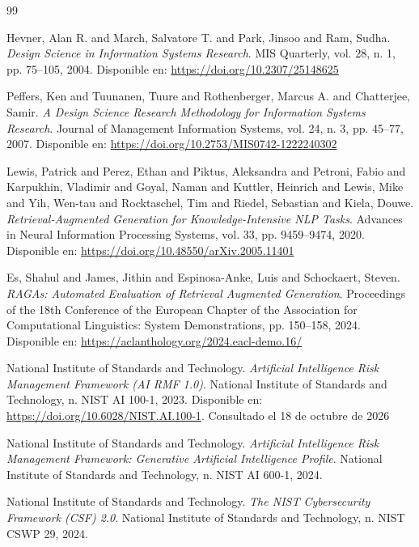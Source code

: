 \documentclass[12pt,twoside,titlepage]{book}
\begin{document}
\cleardoublepage
{}
\begin{thebibliography}{99}

 Hevner, Alan R. and March, Salvatore T. and Park, Jinsoo and Ram, Sudha. \textit{Design Science in Information Systems Research}. MIS Quarterly, vol. 28, n. 1, pp. 75--105, 2004. Disponible en: \url{https://doi.org/10.2307/25148625}

 Peffers, Ken and Tuunanen, Tuure and Rothenberger, Marcus A. and Chatterjee, Samir. \textit{A Design Science Research Methodology for Information Systems Research}. Journal of Management Information Systems, vol. 24, n. 3, pp. 45--77, 2007. Disponible en: \url{https://doi.org/10.2753/MIS0742-1222240302}

 Lewis, Patrick and Perez, Ethan and Piktus, Aleksandra and Petroni, Fabio and Karpukhin, Vladimir and Goyal, Naman and Kuttler, Heinrich and Lewis, Mike and Yih, Wen-tau and Rocktaschel, Tim and Riedel, Sebastian and Kiela, Douwe. \textit{Retrieval-Augmented Generation for Knowledge-Intensive {NLP} Tasks}. Advances in Neural Information Processing Systems, vol. 33, pp. 9459--9474, 2020. Disponible en: \url{https://doi.org/10.48550/arXiv.2005.11401}

 Es, Shahul and James, Jithin and Espinosa-Anke, Luis and Schockaert, Steven. \textit{{RAGAs}: Automated Evaluation of Retrieval Augmented Generation}. Proceedings of the 18th Conference of the European Chapter of the Association for Computational Linguistics: System Demonstrations, pp. 150--158, 2024. Disponible en: \url{https://aclanthology.org/2024.eacl-demo.16/}

 {National Institute of Standards and Technology}. \textit{Artificial Intelligence Risk Management Framework ({AI RMF} 1.0)}. National Institute of Standards and Technology, n. NIST AI 100-1, 2023. Disponible en: \url{https://doi.org/10.6028/NIST.AI.100-1}. Consultado el 18 de octubre de 2026

 {National Institute of Standards and Technology}. \textit{Artificial Intelligence Risk Management Framework: Generative Artificial Intelligence Profile}. National Institute of Standards and Technology, n. NIST AI 600-1, 2024.

 {National Institute of Standards and Technology}. \textit{The {NIST} Cybersecurity Framework ({CSF}) 2.0}. National Institute of Standards and Technology, n. NIST CSWP 29, 2024.


\end{thebibliography}
\end{document}
